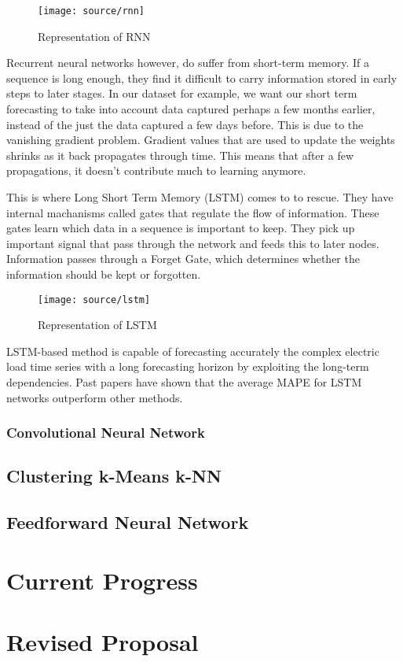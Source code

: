 \documentclass[12pt,twocolumn]{article}
\begin{document}
				\begin{figure}[!htbp]
					\centering
					\texttt{[image: source/rnn]}
					\caption{Representation of RNN}
				\end{figure}

				\quad Recurrent neural networks however, do suffer from short-term memory. If a sequence is long enough, they find it difficult to carry information stored in early steps to later stages. In our dataset for example, we want our short term forecasting to take into account data captured perhaps a few months earlier, instead of the just the data captured a few days before. This is due to the vanishing gradient problem. Gradient values that are used to update the weights shrinks as it back propagates through time. This means that after a few propagations, it doesn't contribute much to learning anymore. 

				\quad This is where Long Short Term Memory (LSTM) comes to to rescue. They have internal machanisms called gates that regulate the flow of information. These gates learn which data in a sequence is important to keep. They pick up important signal that pass through the network and feeds this to later nodes. Information passes through a Forget Gate, which determines whether the information should be kept or forgotten. 

				\begin{figure}[!htbp]
					\centering
					\texttt{[image: source/lstm]}
					\caption{Representation of LSTM}
				\end{figure}

				LSTM-based method is capable of forecasting accurately the complex electric load time series with a long forecasting horizon by exploiting the long-term dependencies. Past papers have shown that the average MAPE for LSTM networks outperform other methods. 

			\subsubsection*{Convolutional Neural Network}
			

		\subsection{Clustering k-Means k-NN}

		\subsection{Feedforward Neural Network}

	\section{Current Progress}

	\section{Revised Proposal}		
	
	
	
\end{document}
